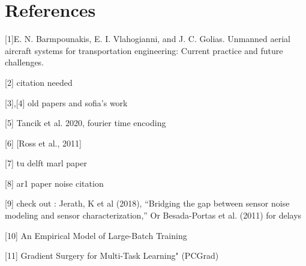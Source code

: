 \chapter*{References}


[1]E. N. Barmpounakis, E. I. Vlahogianni, and J. C. Golias. Unmanned aerial aircraft systems for transportation engineering: Current practice and future challenges.

[2] citation needed

[3],[4] old papers and sofia’s work

[5] Tancik et al. 2020, fourier time encoding

[6] [Ross et al., 2011]

[7] tu delft marl paper

[8] ar1 paper noise citation

[9] check out : Jerath, K et al (2018), “Bridging the gap between sensor noise modeling and sensor characterization,” Or Besada-Portas et al. (2011) for delays

[10] An Empirical Model of Large-Batch Training

[11] Gradient Surgery for Multi-Task Learning" (PCGrad)
